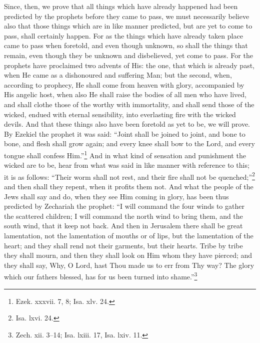 Since, then, we prove that all things which have already happened had been predicted by the prophets before they came to pass, we must necessarily believe also that those things which are in like manner predicted, but are yet to come to pass, shall certainly happen. For as the things which have already taken place came to pass when foretold, and even though unknown, so shall the things that remain, even though they be unknown and disbelieved, yet come to pass. For the prophets have proclaimed two advents of His: the one, that which is already past, when He came as a dishonoured and suffering Man; but the second, when, according to prophecy, He shall come from heaven with glory, accompanied by His angelic host, when also He shall raise the bodies of all men who have lived, and shall clothe those of the worthy with immortality, and shall send those of the wicked, endued with eternal sensibility, into everlasting fire with the wicked devils. And that these things also have been foretold as yet to be, we will prove. By Ezekiel the prophet it was said: “Joint shall be joined to joint, and bone to bone, and flesh shall grow again; and every knee shall bow to the Lord, and every tongue shall confess Him.”\footnote{Ezek. xxxvii. 7, 8; Isa. xlv. 24.} And in what kind of sensation and punishment the wicked are to be, hear from what was said in like manner with reference to this; it is as follows: “Their worm shall not rest, and their fire shall not be quenched;”\footnote{Isa. lxvi. 24.} and then shall they repent, when it profits them not. And what the people of the Jews shall say and do, when they see Him coming in glory, has been thus predicted by Zechariah the prophet: “I will command the four winds to gather the scattered children; I will command the north wind to bring them, and the south wind, that it keep not back. And then in Jerusalem there shall be great lamentation, not the lamentation of mouths or of lips, but the lamentation of the heart; and they shall rend not their garments, but their hearts. Tribe by tribe they shall mourn, and then they shall look on Him whom they have pierced; and they shall say, Why, O Lord, hast Thou made us to err from Thy way? The glory which our fathers blessed, has for us been turned into shame.”\footnote{Zech. xii. 3–14; Isa. lxiii. 17, Isa. lxiv. 11.}



